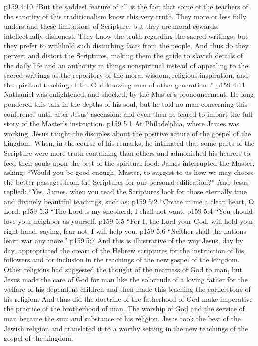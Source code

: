 \vs p159 4:10 \textcolor{ubdarkred}{“But the saddest feature of all is the fact that some of the teachers of the sanctity of this traditionalism know this very truth. They more or less fully understand these limitations of Scripture, but they are moral cowards, intellectually dishonest. They know the truth regarding the sacred writings, but they prefer to withhold such disturbing facts from the people. And thus do they pervert and distort the Scriptures, making them the guide to slavish details of the daily life and an authority in things nonspiritual instead of appealing to the sacred writings as the repository of the moral wisdom, religious inspiration, and the spiritual teaching of the God\hyp{}knowing men of other generations.”}
\pc \vs p159 4:11 Nathaniel was enlightened, and shocked, by the Master’s pronouncement. He long pondered this talk in the depths of his soul, but he told no man concerning this conference until after Jesus’ ascension; and even then he feared to impart the full story of the Master’s instruction.
\vs p159 5:1 At Philadelphia, where James was working, Jesus taught the disciples about the positive nature of the gospel of the kingdom. When, in the course of his remarks, he intimated that some parts of the Scripture were more truth\hyp{}containing than others and admonished his hearers to feed their souls upon the best of the spiritual food, James interrupted the Master, asking: “Would you be good enough, Master, to suggest to us how we may choose the better passages from the Scriptures for our personal edification?” And Jesus replied: \textcolor{ubdarkred}{“Yes, James, when you read the Scriptures look for those eternally true and divinely beautiful teachings, such as:}
\pc \vs p159 5:2 \textcolor{ubdarkred}{“Create in me a clean heart, O Lord.}
\pc \vs p159 5:3 \textcolor{ubdarkred}{“The Lord is my shepherd; I shall not want.}
\pc \vs p159 5:4 \textcolor{ubdarkred}{“You should love your neighbor as yourself.}
\pc \vs p159 5:5 \textcolor{ubdarkred}{“For I, the Lord your God, will hold your right hand, saying, fear not; I will help you.}
\pc \vs p159 5:6 \textcolor{ubdarkred}{“Neither shall the nations learn war any more.”}
\pc \vs p159 5:7 And this is illustrative of the way Jesus, day by day, appropriated the cream of the Hebrew scriptures for the instruction of his followers and for inclusion in the teachings of the new gospel of the kingdom. Other religions had suggested the thought of the nearness of God to man, but Jesus made the care of God for man like the solicitude of a loving father for the welfare of his dependent children and then made this teaching the cornerstone of his religion. And thus did the doctrine of the fatherhood of God make imperative the practice of the brotherhood of man. The worship of God and the service of man became the sum and substance of his religion. Jesus took the best of the Jewish religion and translated it to a worthy setting in the new teachings of the gospel of the kingdom.
